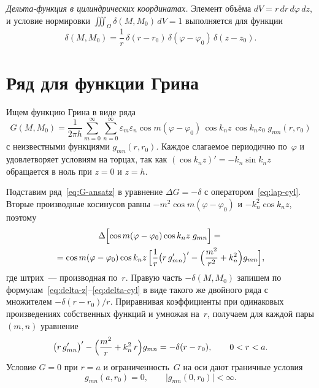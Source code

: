 \emph{Дельта-функция в цилиндрических координатах.} Элемент объёма
$dV=r\,dr\,d\varphi\,dz$, и условие нормировки
$\iiint_\Omega\delta(M,M_0)\,dV=1$ выполняется для функции
\begin{equation}
\label{eq:delta-cyl}
\delta(M,M_0)=\frac{1}{r}\,\delta(r-r_0)\,\delta(\varphi-\varphi_0)\,
\delta(z-z_0) .
\end{equation}

\section{Ряд для функции Грина}
\label{sec:G-series}

Ищем функцию Грина в виде ряда
\begin{equation}
\label{eq:G-ansatz}
G(M,M_0)=\frac{1}{2\pi h}\sum_{m=0}^{\infty}\sum_{n=0}^{\infty}
\varepsilon_m\varepsilon_n\cos m(\varphi-\varphi_0)\,
\cos k_n z\,\cos k_n z_0\;g_{mn}(r,r_0)
\end{equation}
с неизвестными функциями $g_{mn}(r,r_0)$. Каждое слагаемое периодично
по~$\varphi$ и удовлетворяет условиям на торцах, так как
$(\cos k_n z)'=-k_n\sin k_n z$ обращается в ноль при $z=0$ и $z=h$.

Подставим ряд~\eqref{eq:G-ansatz} в уравнение $\Delta G=-\delta$
с оператором~\eqref{eq:lap-cyl}. Вторые производные косинусов равны
$-m^2\cos m(\varphi-\varphi_0)$ и $-k_n^2\cos k_n z$, поэтому
\begin{multline*}
\Delta\Bigl[\cos m(\varphi-\varphi_0)\cos k_n z\;g_{mn}\Bigr]={}\\
=\cos m(\varphi-\varphi_0)\cos k_n z\,
\Bigl[\frac{1}{r}\bigl(r\,g_{mn}'\bigr)'
-\Bigl(\frac{m^2}{r^2}+k_n^2\Bigr)g_{mn}\Bigr],
\end{multline*}
где штрих~— производная по~$r$. Правую часть $-\delta(M,M_0)$ запишем по
формулам~\eqref{eq:delta-z}--\eqref{eq:delta-cyl} в виде такого же
двойного ряда с множителем $-\delta(r-r_0)/r$. Приравнивая коэффициенты
при одинаковых произведениях собственных функций и умножая на~$r$,
получаем для каждой пары $(m,n)$ уравнение
\begin{equation}
\label{eq:radial}
\bigl(r\,g_{mn}'\bigr)'-\Bigl(\frac{m^2}{r}+k_n^2\,r\Bigr)g_{mn}
=-\delta(r-r_0),\qquad 0<r<a .
\end{equation}
Условие $G=0$ при $r=a$ и ограниченность~$G$ на оси дают граничные
условия
\begin{equation}
\label{eq:radial-bc}
g_{mn}(a,r_0)=0,\qquad \bigl|g_{mn}(0,r_0)\bigr|<\infty .
\end{equation}


